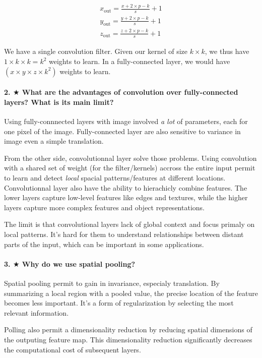 \documentclass{article}
\theoremstyle{plain}%
\theoremstyle{definition}
\theoremstyle{remark}
\begin{document}
\begin{align}
    \label{eq:1} x_{\text{out}} = \frac{x + 2 \times p - k}{s} + 1 \\
    \label{eq:2} y_{\text{out}} = \frac{y + 2 \times p - k}{s} + 1 \\
    \label{eq:3} z_{\text{out}} = \frac{z + 2 \times p - k}{s} + 1 
\end{align}

We have a single convolution filter. Given our kernel of size $ k \times k $, we thus have $ 1 \times k \times k = k^2 $ weights to learn. In a fully-connected layer, we would have $(x \times y \times z \times k^2)$ weights to learn.

\paragraph{2. $ \bigstar $ What are the advantages of convolution over fully-connected layers? What is its main limit?}
Using fully-connnected layers with image involved \textit{a lot} of parameters, each for one pixel of the image. Fully-connected layer are also sensitive to variance in image even a simple translation.

From the other side, convolutionnal layer solve those problems. Using convolution with a shared set of weight (for the filter/kernels) accross the entire input permit to learn and detect \textit{local} spacial patterns/features at different locations. Convolutionnal layer also have the ability to hierachicly combine features. The lower layers capture low-level features like edges and textures, while the higher layers capture more complex features and object representations.

The limit is that convolutional layers lack of global context and focus primaly on local patterns. It's hard for them to understand relationships between distant parts of the input, which can be important in some applications.

\paragraph{3. $ \bigstar $ Why do we use spatial pooling?}
Spatial pooling permit to gain in invariance, especialy translation. By summarizing a local region with a pooled value, the precise location of the feature becomes less important. It's a form of regularization by selecting the most relevant information.

Polling also permit a dimensionality reduction by reducing spatial dimensions of the outputing feature map. This dimensionality reduction significantly decreases the computational cost of subsequent layers.
\end{document}
